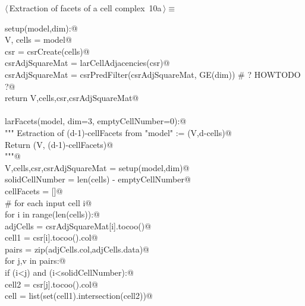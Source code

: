 \documentclass[11pt,oneside]{article}	%
\begin{document}
\begin{flushleft} \small \label{scrap18}
\protect{}$\langle\,$Extraction of facets of a cell complex\nobreak\ {\footnotesize 10a}$\,\rangle\equiv$
\vspace{-1ex}
\begin{list}{}{} \item
\mbox{}\verb@def setup(model,dim):@\\
\mbox{}\verb@   V, cells = model@\\
\mbox{}\verb@   csr = csrCreate(cells)@\\
\mbox{}\verb@   csrAdjSquareMat = larCellAdjacencies(csr)@\\
\mbox{}\verb@   csrAdjSquareMat = csrPredFilter(csrAdjSquareMat, GE(dim)) # ? HOWTODO ?@\\
\mbox{}\verb@   return V,cells,csr,csrAdjSquareMat@\\
\mbox{}\verb@@\\
\mbox{}\verb@def larFacets(model, dim=3, emptyCellNumber=0):@\\
\mbox{}\verb@   """ Estraction of (d-1)-cellFacets from "model" := (V,d-cells)@\\
\mbox{}\verb@      Return (V, (d-1)-cellFacets)@\\
\mbox{}\verb@      """@\\
\mbox{}\verb@   V,cells,csr,csrAdjSquareMat = setup(model,dim)@\\
\mbox{}\verb@   solidCellNumber = len(cells) - emptyCellNumber@\\
\mbox{}\verb@   cellFacets = []@\\
\mbox{}\verb@   # for each input cell i@\\
\mbox{}\verb@   for i in range(len(cells)):@\\
\mbox{}\verb@      adjCells = csrAdjSquareMat[i].tocoo()@\\
\mbox{}\verb@      cell1 = csr[i].tocoo().col@\\
\mbox{}\verb@      pairs = zip(adjCells.col,adjCells.data)@\\
\mbox{}\verb@      for j,v in pairs:@\\
\mbox{}\verb@         if (i<j) and (i<solidCellNumber):@\\
\mbox{}\verb@            cell2 = csr[j].tocoo().col@\\
\mbox{}\verb@            cell = list(set(cell1).intersection(cell2))@\\

\end{list}
\end{flushleft}
\end{document}
